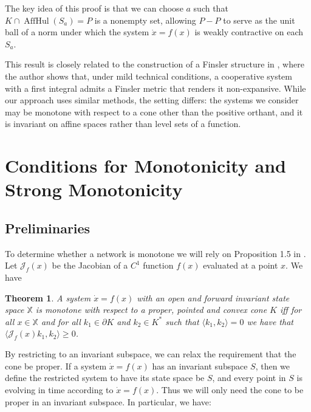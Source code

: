 \documentclass{article}
\newtheorem{thm}{Theorem}
\begin{document}
The key idea of this proof is that we can choose $a$ such that $K \cap \operatorname{AffHul}(S_a) = P$ is a nonempty set, allowing $P - P$ to serve as the unit ball of a norm under which the system $\dot{x} = f(x)$ is weakly contractive on each $S_a$. 

This result is closely related to the construction of a Finsler structure in \cite{Mierczyński1991}, where the author shows that, under mild technical conditions, a cooperative system with a first integral admits a Finsler metric that renders it non-expansive. While our approach uses similar methods, the setting differs: the systems we consider may be monotone with respect to a cone other than the positive orthant, and it is invariant on affine spaces rather than level sets of a function.







\section{Conditions for Monotonicity and Strong Monotonicity}

\subsection{Preliminaries}

\label{sec:Conditions for monotone}
To determine whether a network is monotone we will rely on Proposition 1.5 in \cite{WALCHER2001543}. Let $\mathcal{J}_f(x)$ be the Jacobian of a $C^1$ function $f(x)$ evaluated at a point $x$. We have

\begin{thm}
\label{thm:monotone}
    \cite{WALCHER2001543} A system $\dot{x} = f(x)$ with an open and forward invariant state space $\mathbb{X}$ is monotone with respect to a proper, pointed and convex cone $K$ iff for all $x \in \mathbb{X}$ and for all $k_1\in \partial K$ and $k_2 \in K^*$ such that $\langle k_1, k_2 \rangle = 0$ we have that $\langle \mathcal{J}_f(x) k_1, k_2 \rangle \geq 0$.
\end{thm}

By restricting to an invariant subspace, we can relax the requirement that the cone be proper. If a system $\dot{x} = f(x)$ has an invariant subspace $S$, then we define the restricted system to have its state space be $S$, and every point in $S$ is evolving in time according to $\dot{x} = f(x)$. Thus we will only need the cone to be proper in an invariant subspace. In particular, we have:
\end{document}
